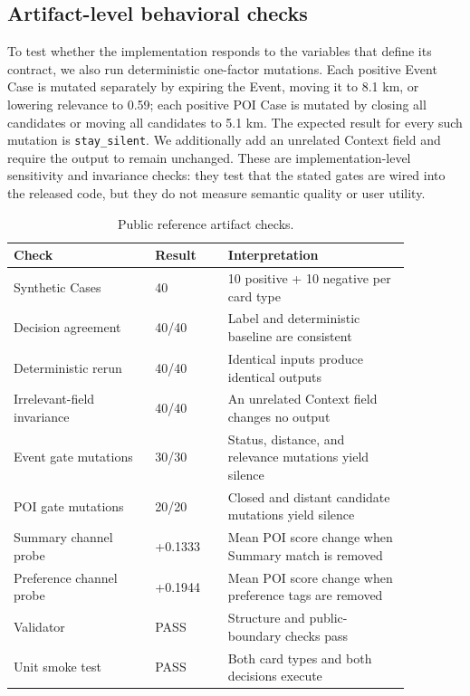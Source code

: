 \documentclass[10pt]{article}
\newcommand{\silent}{\texttt{stay\_silent}}
\begin{document}
\subsection{Artifact-level behavioral checks}

To test whether the implementation responds to the variables that define its contract, we also run deterministic one-factor mutations. Each positive Event Case is mutated separately by expiring the Event, moving it to 8.1 km, or lowering relevance to 0.59; each positive POI Case is mutated by closing all candidates or moving all candidates to 5.1 km. The expected result for every such mutation is \silent{}. We additionally add an unrelated Context field and require the output to remain unchanged. These are implementation-level sensitivity and invariance checks: they test that the stated gates are wired into the released code, but they do not measure semantic quality or user utility.

\begin{table}[t]
\centering
\small
\caption{Public reference artifact checks.}
\label{tab:checks}
\begin{tabular}{P{0.31\linewidth}P{0.16\linewidth}P{0.40\linewidth}}
\toprule
Check & Result & Interpretation \\
\midrule
Synthetic Cases & 40 & 10 positive + 10 negative per card type \\
Decision agreement & 40/40 & Label and deterministic baseline are consistent \\
Deterministic rerun & 40/40 & Identical inputs produce identical outputs \\
Irrelevant-field invariance & 40/40 & An unrelated Context field changes no output \\
Event gate mutations & 30/30 & Status, distance, and relevance mutations yield silence \\
POI gate mutations & 20/20 & Closed and distant candidate mutations yield silence \\
Summary channel probe & +0.1333 & Mean POI score change when Summary match is removed \\
Preference channel probe & +0.1944 & Mean POI score change when preference tags are removed \\
Validator & PASS & Structure and public-boundary checks pass \\
Unit smoke test & PASS & Both card types and both decisions execute \\
\bottomrule
\end{tabular}
\end{table}
\end{document}
